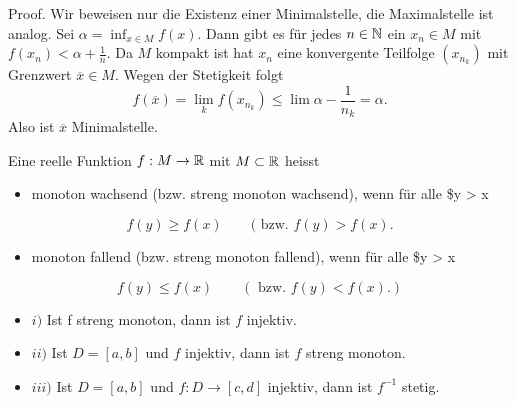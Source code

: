 \begin{emphBox}{}{}
Proof. Wir beweisen nur die Existenz einer Minimalstelle, die Maximalstelle ist analog. Sei \(\alpha = \inf_{x \in M} f(x)\). Dann gibt es für jedes \(n \in \mathbb{N}\) ein \(x_n \in M\) mit \(f(x_n) < \alpha+ \frac{1}n\). Da \(M\) kompakt ist hat \(x_n\) eine konvergente Teilfolge \((x_{n_k})\) mit Grenzwert \(\overline{x} \in M\). Wegen der Stetigkeit folgt
\begin{equation*}
 f(\overline{x}) = \lim_k f(x_{n_k}) \leq \lim \alpha - \frac{1}{n_k} = \alpha.
\end{equation*}
Also ist \(\overline{x}\) Minimalstelle.
\end{emphBox}
\label{stetigkeit/eigenschaften:definition-3}
\begin{definition}{}{}



Eine reelle Funktion \(f: M \rightarrow \mathbb{R}\) mit \(M \subset \mathbb{R}\) heisst
\begin{itemize}
\item {} 
monoton wachsend (bzw. streng monoton wachsend), wenn für alle \$y > x

\end{itemize}
\begin{equation*}
 f(y) \geq f(x) \qquad (\text{ bzw. } f(y) > f(x).
\end{equation*}\begin{itemize}
\item {} 
monoton fallend (bzw. streng monoton fallend), wenn für alle \$y > x

\end{itemize}
\begin{equation*}
 f(y) \leq f(x) \qquad (\text{ bzw. } f(y) < f(x). )
\end{equation*}\end{definition}
\label{stetigkeit/eigenschaften:theorem-4}
\begin{theorem}{}{}


\begin{itemize}
\item {} 
\(i)\) Ist f streng monoton, dann ist \(f\) injektiv.

\item {} 
\(ii)\) Ist \(D=[a,b]\) und \(f\) injektiv, dann ist \(f\) streng monoton.

\item {} 
\(iii)\) Ist \(D=[a,b]\) und \(f:D \rightarrow [c,d]\) injektiv, dann ist \(f^{-1}\) stetig.

\end{itemize}
\end{theorem}

